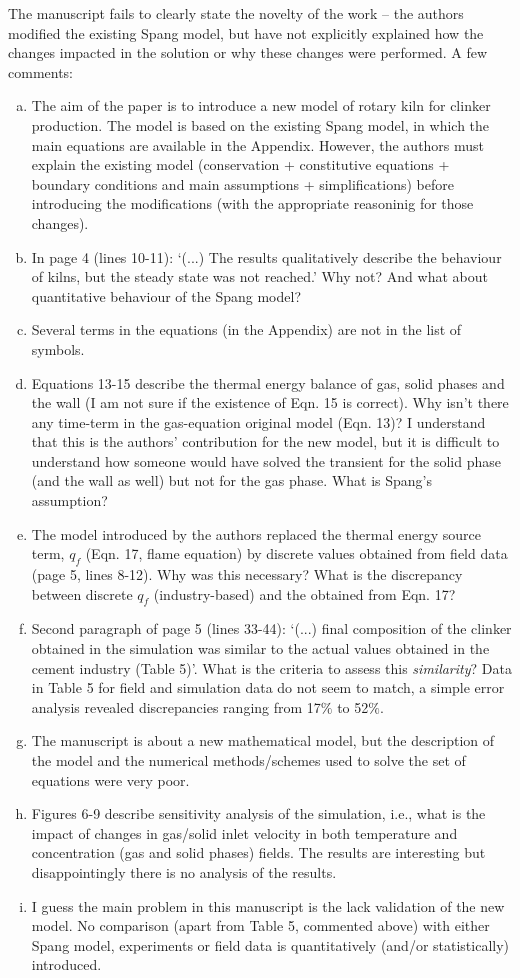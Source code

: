 \documentclass[14pt,twoside]{report}
\begin{document}
The manuscript fails to clearly state the novelty of the work -- the authors modified the existing Spang model, but have not explicitly explained how the changes impacted in the solution or why these changes were performed. A few comments:
\begin{enumerate}[(a)] 
%
\item The aim of the paper is to introduce a new model of rotary kiln for clinker production. The model is based on the existing Spang model, in which the main equations are available in the Appendix. However, the authors must explain the existing model (conservation + constitutive equations + boundary conditions and main assumptions + simplifications) before introducing the modifications (with the appropriate reasoninig for those changes). 
%
\item In page 4 (lines 10-11): `(...) The results qualitatively describe the behaviour of kilns, but the steady state was not reached.' Why not? And what about quantitative behaviour of the Spang model?
%
\item Several terms in the equations (in the Appendix) are not in the list of symbols.
%
\item Equations 13-15 describe the thermal energy balance of gas, solid phases and the wall (I am not sure if the existence of Eqn. 15 is correct). Why isn't there any time-term in the gas-equation original model (Eqn. 13)? I understand that this is the authors' contribution for the new model, but it is difficult to understand how someone would have solved the transient for the solid phase (and the wall as well) but not for the gas phase. What is Spang's assumption? 
%
\item The model introduced by the authors replaced the thermal energy source term, $q_{f}$ (Eqn. 17, flame equation) by discrete values obtained from field data (page 5, lines 8-12). Why was this necessary? What is the discrepancy between discrete $q_{f}$ (industry-based) and the obtained from Eqn. 17?
%
\item Second paragraph of page 5 (lines 33-44): `(...) final composition of the clinker obtained in the simulation was similar to the actual values obtained in the cement industry (Table 5)'. What is the criteria to assess this {\it similarity}? Data in Table 5 for field and simulation data do not seem to match, a simple error analysis revealed discrepancies ranging from 17$\%$ to 52$\%$.
%
\item The manuscript is about a new mathematical model, but the description of the model and the numerical methods/schemes used to solve the set of equations were very poor.
%
\item Figures 6-9 describe sensitivity analysis of the simulation, i.e., what is the impact of changes in gas/solid inlet velocity in both temperature and concentration (gas and solid phases) fields. The results are interesting but disappointingly there is no analysis of the results.
%
\item I guess the main problem in this manuscript is the lack validation of the new model. No comparison (apart from Table 5, commented above) with either Spang model, experiments or field data is quantitatively (and/or statistically) introduced.
%
\end{enumerate}
\end{document}
